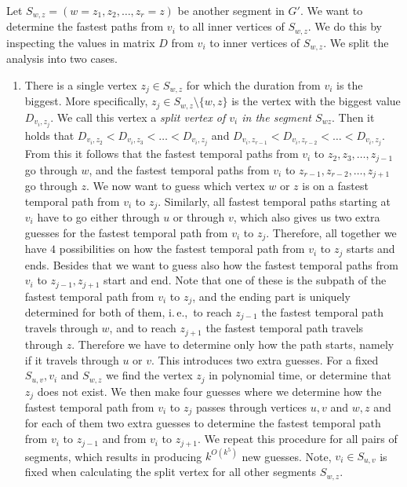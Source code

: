 \documentclass[a4paper,UKenglish,cleveref, autoref, thm-restate, anonymous]{lipics-v2021}
\newcommand{\ie}{i.\,e.,\ }
\begin{document}
\begin{enumerate}[G-1.]
	Let 
	$S_{w,z} = (w=z_1,z_2, \dots, z_r = z)$ be another segment in $G'$.
	We want to determine the fastest paths from $v_i$ to all inner vertices of $S_{w,z}$. We do this by inspecting the values in matrix $D$ from $v_i$ to inner vertices of $S_{w,z}$.
	We split the analysis into two cases.
	\begin{enumerate}
		\item 
		There is a single vertex $z_j \in S_{w,z}$ for which the duration from $v_i$ is the biggest.
		More specifically, $z_j \in S_{w,z} \setminus \{w,z\}$ is the vertex with the biggest value  $D_{v_i,z_j}$.
		We call this vertex a \emph{split vertex of $v_i$ in the segment $S_{wz}$}.
		Then it holds that $D_{v_i,z_2} < D_{v_i,z_3} < \dots < D_{v_i,z_j}$ and 
		$D_{v_i,z_{r-1}} < D_{v_i,z_{r-2}} < \dots < D_{v_i,z_j}$.
		From this it follows that the fastest temporal paths from $v_i$ to $z_2, z_3, \dots, z_{j-1}$ go through $w$,
		and 
		the fastest temporal paths from $v_i$ to $z_{r-1}, z_{r-2}, \dots, z_{j+1}$ go through $z$.
		We now want to guess which vertex $w$ or $z$ is on a fastest temporal path from $v_i$ to $z_j$.
		Similarly,
		all fastest temporal paths starting at $v_i$ have to go either through $u$ or through $v$,
		which also gives us two extra guesses for the fastest temporal path from $v_i$ to $z_j$.
		Therefore, all together we have $4$ possibilities on how the fastest temporal path from $v_i$ to $z_j$ starts and ends.
		Besides that we want to guess also how the fastest temporal paths from $v_i$ to $z_{j-1}, z_{j+1}$ start and end.
		Note that one of these is the subpath of the fastest temporal path from $v_i$ to $z_j$, and the ending part is uniquely determined for both of them,
		\ie to reach $z_{j-1}$ the fastest temporal path travels through $w$, and to reach $z_{j+1}$ the fastest temporal path travels through $z$.
		Therefore we have to determine only how the path starts, namely if it travels through $u$ or $v$.
		This introduces two extra guesses.
		For a fixed $S_{u,v}, v_i$ and $S_{w,z}$ we find the vertex $z_j$ in polynomial time, 
		or determine that $z_j$ does not exist.
		We then make four guesses where we determine how the fastest temporal path from $v_i$ to $z_j$ passes through vertices $u,v$ and $w,z$ and 
		for each of them two extra guesses to determine the fastest temporal path from $v_i$ to $z_{j-1}$ and from $v_i$ to $z_{j+1}$.
		We repeat this procedure for all pairs of segments,
		which results in producing $k^{O(k^5)}$ new guesses.
		Note, $v_i \in S_{u,v}$ is fixed when calculating the split vertex for all other segments $S_{w,z}$.

\end{enumerate}
\end{enumerate}
\end{document}
